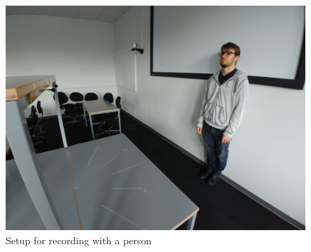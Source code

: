 \begin{figure}[htp]
	\centering
	\includegraphics[width=.8\textwidth]{Illustrations/razvanWithSetup.jpg}
	\caption{Setup for recording with a person}
	\label{fig:RanzvanRecSetup}
\end{figure}

